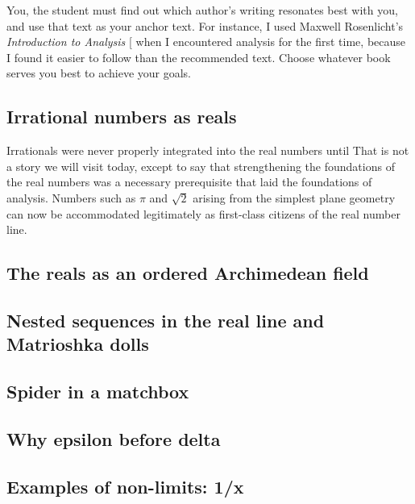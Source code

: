 \documentclass[
  a4paper,
]{article}
\begin{document}
You, the student must find out which author's writing resonates best
with you, and use that text as your anchor text. For instance, I used
Maxwell Rosenlicht's \emph{Introduction to Analysis}
{[}\citeproc{ref-rosenlicht1986}{10}{]} when I encountered analysis for
the first time, because I found it easier to follow than the recommended
text. Choose whatever book serves you best to achieve your goals.

\subsection{Irrational numbers as
reals}\label{irrational-numbers-as-reals}

Irrationals were never properly integrated into the real numbers until
That is not a story we will visit today, except to say that
strengthening the foundations of the real numbers was a necessary
prerequisite that laid the foundations of analysis. Numbers such as
\(\pi\) and \(\sqrt{2}\) arising from the simplest plane geometry can
now be accommodated legitimately as first-class citizens of the real
number line.

\subsection{The reals as an ordered Archimedean
field}\label{the-reals-as-an-ordered-archimedean-field}

\subsection{Nested sequences in the real line and Matrioshka
dolls}\label{nested-sequences-in-the-real-line-and-matrioshka-dolls}

\subsection{Spider in a matchbox}\label{spider-in-a-matchbox}

\subsection{Why epsilon before delta}\label{why-epsilon-before-delta}

\subsection{Examples of non-limits:
1/x}\label{examples-of-non-limits-1x}
\end{document}
